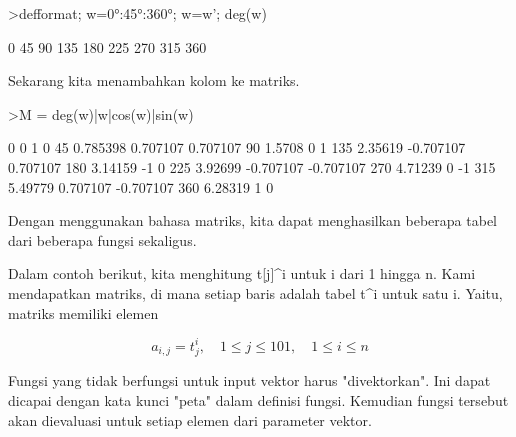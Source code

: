 \documentclass[a4paper,10pt]{article}
\begin{document}
\begin{eulernotebook}
\begin{eulercomment}
\begin{eulercomment}
\begin{eulercomment}
\begin{eulercomment}
\begin{eulercomment}
\begin{eulercomment}
\begin{eulerprompt}
>defformat; w=0°:45°:360°; w=w'; deg(w)
\end{eulerprompt}
\begin{euleroutput}
              0 
             45 
             90 
            135 
            180 
            225 
            270 
            315 
            360 
\end{euleroutput}
\begin{eulercomment}
Sekarang kita menambahkan kolom ke matriks.
\end{eulercomment}
\begin{eulerprompt}
>M = deg(w)|w|cos(w)|sin(w)
\end{eulerprompt}
\begin{euleroutput}
              0             0             1             0 
             45      0.785398      0.707107      0.707107 
             90        1.5708             0             1 
            135       2.35619     -0.707107      0.707107 
            180       3.14159            -1             0 
            225       3.92699     -0.707107     -0.707107 
            270       4.71239             0            -1 
            315       5.49779      0.707107     -0.707107 
            360       6.28319             1             0 
\end{euleroutput}
\begin{eulercomment}
Dengan menggunakan bahasa matriks, kita dapat menghasilkan beberapa
tabel dari beberapa fungsi sekaligus.

Dalam contoh berikut, kita menghitung t[j]\textasciicircum{}i untuk i dari 1 hingga n.
Kami mendapatkan matriks, di mana setiap baris adalah tabel t\textasciicircum{}i untuk
satu i. Yaitu, matriks memiliki elemen\\
\end{eulercomment}
\begin{eulerformula}
\[
a_{i,j} = t_j^i, \quad 1 \le j \le 101, \quad 1 \le i \le n
\]
\end{eulerformula}
\begin{eulercomment}
Fungsi yang tidak berfungsi untuk input vektor harus "divektorkan".
Ini dapat dicapai dengan kata kunci "peta" dalam definisi fungsi.
Kemudian fungsi tersebut akan dievaluasi untuk setiap elemen dari
parameter vektor.


\end{eulercomment}
\end{eulercomment}
\end{eulercomment}
\end{eulercomment}
\end{eulercomment}
\end{eulercomment}
\end{eulercomment}
\end{eulernotebook}
\end{document}
